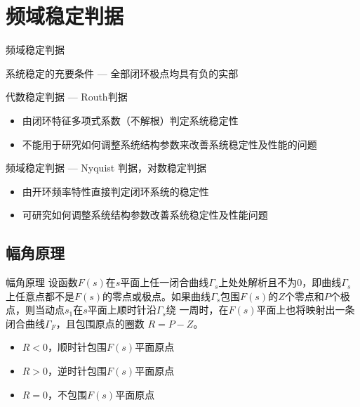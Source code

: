 \documentclass[handout,cjkutf8,table,aspectratio=1610]{beamer} %
\begin{document}
\section{频域稳定判据}
\begin{frame}{频域稳定判据}
	\begin{block}{系统稳定的充要条件 {\color{red}\sf— 全部闭环极点均具有负的实部}}
	\end{block}
	\begin{block}{代数稳定判据 {\color{red}\sf— Routh判据 }}
		\begin{itemize}
			\item 由闭环特征多项式系数（不解根）判定系统稳定性
			\item 不能用于研究如何调整系统结构参数来改善系统稳定性及性能的问题
		\end{itemize}
	\end{block}
	\begin{block}{频域稳定判据 {\color{red}\sf — Nyquist 判据，对数稳定判据 }}
		\begin{itemize}
			\item 由开环频率特性直接判定闭环系统的稳定性 
			\item 可研究如何调整系统结构参数改善系统稳定性及性能问题
		\end{itemize}
	\end{block}
\end{frame}

\subsection{幅角原理}
\begin{frame}{幅角原理}
	  \textsf{设函数$F(s)$在$s$平面上任一闭合曲线$\Gamma_s$上处处解析且不为0，即曲线$\Gamma_s$上任意点都不是$F(s)$的零点或极点。如果曲线$\Gamma_s$包围$F(s)$的$Z$个零点和$P$个极点，则当动点$s_1$在$s$平面上顺时针沿$\Gamma_s$绕 一周时，在$F(s)$平面上也将映射出一条闭合曲线$\Gamma_F$，且包围原点的圈数 $R=P-Z$。}
	\begin{itemize}
		\item $R<0$，顺时针包围$F(s)$平面原点
		\item $R>0$，逆时针包围$F(s)$平面原点
		\item $R=0$，不包围$F(s)$平面原点
	\end{itemize}
\end{frame}
\end{document}
